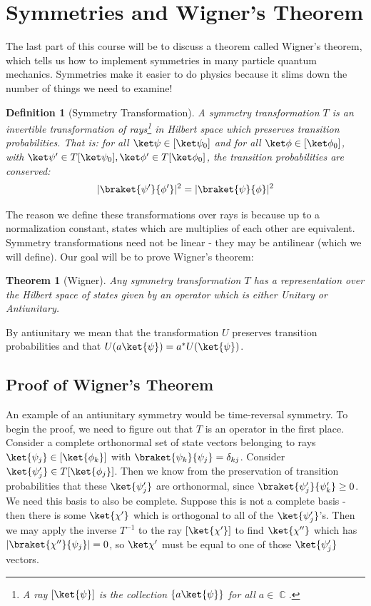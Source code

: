 \documentclass{article}
\DeclareMathOperator{\CC}{\mathbb{C}}
\newtheorem{defn}{Definition}
\newtheorem{thm}{Theorem}
\begin{document}
\pagebreak
\section{Symmetries and Wigner's Theorem}
The last part of this course will be to discuss a theorem called Wigner's theorem, which tells us how to implement symmetries in many particle quantum mechanics. Symmetries make it easier to do physics because it slims down the number of things we need to examine! 
\begin{defn}[Symmetry Transformation] A symmetry transformation $T$ is an invertible transformation of rays\footnote{A ray $[{\ket{\psi}}]$ is the collection $\{a\ket{\psi}\}$ for all $a \in \CC$.} in Hilbert space which preserves transition probabilities. That is: for all $\ket\psi \in [\ket\psi_0]$ and for all $\ket\phi \in [\ket\phi_0]$, with $\ket\psi' \in T[\ket\psi_0], \ket\phi'\in T[\ket\phi_0]$, the transition probabilities are conserved:
\[|\braket{\psi'}{\phi'}|^2 = |\braket{\psi}{\phi}|^2\] 
\end{defn}
The reason we define these transformations over rays is because up to a normalization constant, states which are multiplies of each other are equivalent. Symmetry transformations need not be linear - they may be antilinear (which we will define). Our goal will be to prove Wigner's theorem:
\begin{thm}[Wigner] Any symmetry transformation $T$ has a representation over the Hilbert space of states given by an operator which is either Unitary or Antiunitary.
\end{thm}
By antiunitary we mean that the transformation $U$ preserves transition probabilities and that $U(a\ket{\psi}) = a^* U(\ket{\psi})$.
\subsection{Proof of Wigner's Theorem}
An example of an antiunitary symmetry would be time-reversal symmetry. To begin the proof, we need to figure out that $T$ is an operator in the first place. Consider a complete orthonormal set of state vectors belonging to rays $\ket{\psi_j} \in [\ket{\phi_k}]$ with $\braket{\psi_k}{\psi_j} = \delta_{kj}$. Consider $\ket{\psi_j'} \in T[\ket{\phi_j}]$. Then we know from the preservation of transition probabilities that these $\ket{\psi_j'}$ are orthonormal, since $\braket{\psi'_j}{\psi'_k} \geq 0$. We need this basis to also be complete. Suppose this is not a complete basis - then there is some $\ket{\chi'}$ which is orthogonal to all of the $\ket{\psi_j'}$'s. Then we may apply the inverse $T^{-1}$ to the ray $[\ket{\chi'}]$ to find $\ket{\chi''}$ which has $|\braket{\chi''}{\psi_j}| = 0$, so $\ket\chi'$ must be equal to one of those $\ket{\psi'_j}$ vectors.
\end{document}
